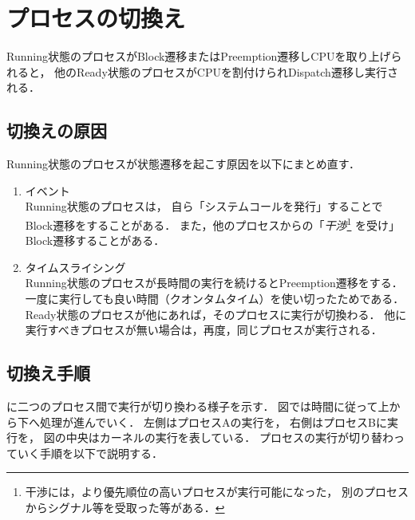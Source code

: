 \section{プロセスの切換え}
Running状態のプロセスがBlock遷移またはPreemption遷移しCPUを取り上げられると，
他のReady状態のプロセスがCPUを割付けられDispatch遷移し実行される．

\subsection{切換えの原因}
Running状態のプロセスが状態遷移を起こす原因を以下にまとめ直す．

\begin{enumerate}
\item イベント \\
  Running状態のプロセスは，
  自ら「システムコールを発行」することでBlock遷移をすることがある．
  また，他のプロセスからの「\emph{干渉}\footnote{
      干渉には，より優先順位の高いプロセスが実行可能になった，
      別のプロセスからシグナル等を受取った等がある．}
    を受け」Block遷移することがある．
\item タイムスライシング \\
  Running状態のプロセスが長時間の実行を続けるとPreemption遷移をする．
  一度に実行しても良い時間（クオンタムタイム）を使い切ったためである．
  Ready状態のプロセスが他にあれば，そのプロセスに実行が切換わる．
  他に実行すべきプロセスが無い場合は，再度，同じプロセスが実行される．
\end{enumerate}

\subsection{切換え手順}
に二つのプロセス間で実行が切り換わる様子を示す．
図では時間に従って上から下へ処理が進んでいく．
左側はプロセスAの実行を，
右側はプロセスBに実行を，
図の中央はカーネルの実行を表している．
プロセスの実行が切り替わっていく手順を以下で説明する．

